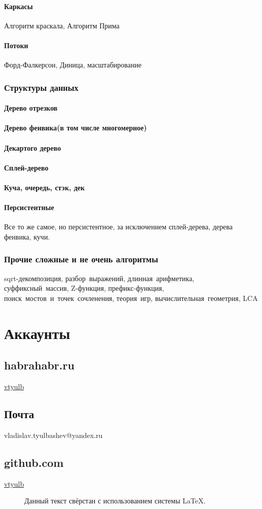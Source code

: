 \documentclass[a4paper,10pt]{article}
\begin{document}
{{{	    \paragraph{Каркасы}{Алгоритм краскала, Алгоритм Прима}
	    \paragraph{Потоки}{Форд-Фалкерсон, Диница, масштабирование}
	}
	\subsubsection{Структуры данных}{
	    \paragraph{Дерево отрезков}{}
	    \paragraph{Дерево фенвика(в том числе многомерное)}{}
	    \paragraph{Декартого дерево}{}
	    \paragraph{Сплей-дерево}{}
	    \paragraph{Куча, очередь, стэк, дек}{}
	    \paragraph{Персистентные}{Все то же самое, но персистентное, за исключением сплей-дерева, дерева фенвика, кучи.}
	}
	\subsubsection{Прочие сложные и не очень алгоритмы}{sqrt-декомпозиция, разбор~выражений, длинная~арифметика, 
			суффиксный~массив, Z-функция, префикс-функция, поиск~мостов~и~точек~сочленения, теория~игр, 
			вычислительная~геометрия, LCA}
    }
}
\section{Аккаунты}{
    \subsection{habrahabr.ru}{\href{http://habrahabr.ru/users/vtyulb/}{vtyulb}}
    \subsection{Почта}{vladislav.tyulbashev@yandex.ru}
    \subsection{github.com}{\href{https://github.com/vtyulb}{vtyulb}}
}
\begin{figure}[b]
    \centering
    Данный текст свёрстан с использованием системы \LaTeX.
\end{figure}
\end{document}
